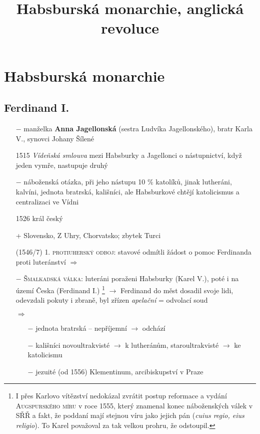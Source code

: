\documentclass{article}
\title{\vspace{-2cm}Habsburská monarchie, anglická revoluce\vspace{-1.7cm}}
\date{}
\author{}
\begin{document}
\maketitle

\section*{Habsburská monarchie}

\subsection*{Ferdinand I. }
\begin{itemize}
    \vspace{-0.5em}
    \setlength\itemsep{0.15em}
    \item[$-$] manželka \textbf{Anna Jagellonská} (sestra Ludvíka Jagellonského), bratr Karla V., synovci Johany Šílené
    \item[1515] \textit{Vídeňská smlouva} mezi Habsburky a Jagellonci o nástupnictví, když jeden vymře, nastupuje druhý
    \item[$-$] náboženská otázka, při jeho nástupu 10 \% katolíků, jinak lutheráni, kalvíni, jednota bratrská, kališníci, ale Habsburkové chtějí katolicismus a centralizaci ve Vídni
    \item[1526] král český
    \item[+] Slovensko, Z Uhry, Chorvatsko; zbytek Turci
    \item[(1546/7)] \textsc{1. protiuherský odboj}: stavové odmítli žádost o pomoc Ferdinanda proti luteránství $\Rightarrow$
    \item[$-$] \textsc{Šmalkadská válka}: luteráni poraženi Habsburky (Karel V.), poté i na území Česka (Ferdinand I.) \footnote{I přes Karlovo vítězství nedokázal zvrátit postup reformace a vydání \textsc{Augspurského míru} v roce 1555, který znamenal konec náboženských válek v SŘŘ a fakt, že poddaní mají stejnou víru jako jejich pán (\textit{cuius regio, eius religio}). To Karel považoval za tak velkou prohru, že odstoupil.} $\rightarrow$ Ferdinand do měst dosadil svoje lidi, odevzdali pokuty i zbraně, byl zřízen \textit{apelační} = odvolací soud
    \item[$\Rightarrow$] \begin{itemize}
        \vspace{-0.5em}
        \setlength\itemsep{0.15em}
        \item[$-$] jednota bratrská -- nepříjemní $\rightarrow$ odchází
        \item[$-$] kališníci novoultrakvisté $\rightarrow$ k lutheránům, staroultrakvisté $\rightarrow$ ke katolicismu
        \item[$-$] jezuité (od 1556) Klementinum, arcibiskupství v Praze
    \end{itemize}
\end{itemize}
\end{document}

